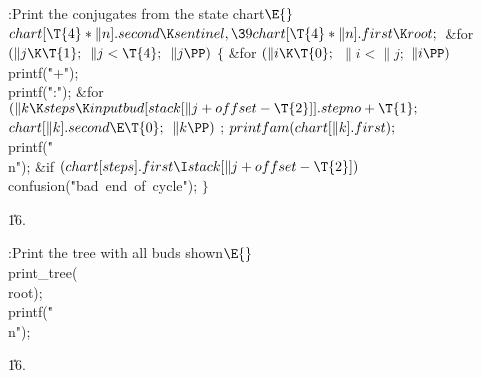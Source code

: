 \Y\B\4:Print the conjugates from the state chart\X${}\E{}$\6
$\\{chart}[\T{4}*\|n].\\{second}\K\\{sentinel},\39\\{chart}[\T{4}*\|n].%
\\{first}\K\\{root};{}$\6
\&{for} ${}(\|j\K\T{1};{}$ ${}\|j<\T{4};{}$ ${}\|j\PP){}$\5
${}\{{}$\1\6
\&{for} ${}(\|i\K\T{0};{}$ ${}\|i<\|j;{}$ ${}\|i\PP){}$\1\5
\\{printf}(\.{"+"});\2\6
\\{printf}(\.{":"});\6
\&{for} ${}(\|k\K\\{steps}\K\\{inputbud}[\\{stack}[\|j+\\{offset}-\T{2}]].%
\\{stepno}+\T{1};{}$ ${}\\{chart}[\|k].\\{second}\E\T{0};{}$ ${}\|k\PP){}$\1\5
;\2\6
${}\\{printfam}(\\{chart}[\|k].\\{first});{}$\6
\\{printf}(\.{"\\n"});\6
\&{if} ${}(\\{chart}[\\{steps}].\\{first}\I\\{stack}[\|j+\\{offset}-\T{2}]){}$%
\1\5
\\{confusion}(\.{"bad\ end\ of\ cycle"});\2\6
\4${}\}{}$\2\par
\U16.\fi

\B{}:Print the tree with all buds shown\X${}%
\E{}$\6
\\{print\_tree}(\\{root});\6
\\{printf}(\.{"\\n"});\par
\U16.\fi

